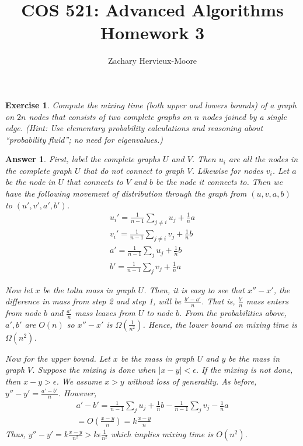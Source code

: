 \documentclass[12pt]{article}
\title{COS 521: Advanced Algorithms \\ Homework 3}
\author{Zachary Hervieux-Moore}
\date{\displaydate{date}}
\theoremstyle{colon}
\newtheorem{exercise}{Exercise}
\newtheorem*{answer}{Answer}
\begin{document}
\maketitle

\clearpage

\begin{exercise}
  Compute the mixing time (both upper and lowers bounds) of a graph on $2n$ nodes that consists of two complete graphs on $n$ nodes joined by a single edge. (Hint: Use elementary probability calculations and reasoning about ``probability fluid''; no need for eigenvalues.)
\end{exercise}

\begin{answer}
  First, label the complete graphs $U$ and $V$. Then $u_i$ are all the nodes in the complete graph $U$ that do not connect to graph $V$. Likewise for nodes $v_i$. Let $a$ be the node in $U$ that connects to $V$ and $b$ be the node it connects to. Then we have the following movement of distribution through the graph from $(u,v,a,b)$ to $(u',v',a',b')$.
  \begin{gather*}
    u_i' = \frac{1}{n-1} \sum_{j \neq i} u_j + \frac{1}{n} a \\
    v_i' = \frac{1}{n-1} \sum_{j \neq i} v_j + \frac{1}{n} b \\
    a' = \frac{1}{n-1} \sum_{j} u_j + \frac{1}{n} b \\
    b' = \frac{1}{n-1} \sum_{j} v_j + \frac{1}{n} a
  \end{gather*}

  Now let $x$ be the tolta mass in graph $U$. Then, it is easy to see that $x''-x'$, the difference in mass from step 2 and step 1, will be $\frac{b'-a'}{n}$. That is, $\frac{b'}{n}$ mass enters from node $b$ and $\frac{a'}{n}$ mass leaves from $U$ to node $b$. From the probabilities above, $a',b'$ are $O(n)$ so $x''-x'$ is $\Omega(\frac{1}{n^2})$. Hence, the lower bound on mixing time is $\Omega(n^2)$.

  Now for the upper bound. Let $x$ be the mass in graph $U$ and $y$ be the mass in graph $V$. Suppose the mixing is done when $\lvert x - y \rvert < \epsilon$. If the mixing is not done, then $x-y > \epsilon$. We assume $ x > y$ without loss of generality. As before, $y''-y' = \frac{a'-b'}{n}$. However,
  \begin{gather*}
    a' - b' = \frac{1}{n-1} \sum_{j} u_j + \frac{1}{n} b - \frac{1}{n-1} \sum_{j} v_j - \frac{1}{n} a \\
    = O \left( \frac{x-y}{n} \right) = k \frac{x-y}{n}
  \end{gather*}
  Thus, $y''-y' = k \frac{x-y}{n^2} > k \epsilon \frac{1}{n^2}$ which implies mixing time is $O(n^2)$.
\end{answer}
\end{document}
